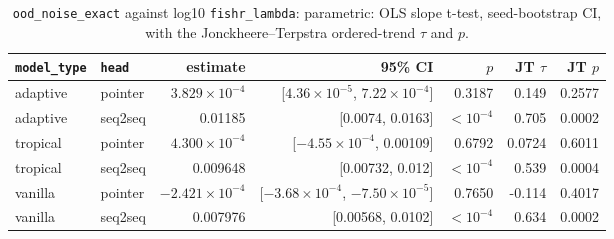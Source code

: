 \documentclass[10pt]{article}
\begin{document}
{\small
\begin{longtable}{llrrrrr}
\caption{\texttt{ood\_noise\_exact} against log10 \texttt{fishr\_lambda}: parametric: OLS slope t-test, seed-bootstrap CI, with the Jonckheere--Terpstra ordered-trend $\tau$ and $p$.}\label{tab:trend-ood_noise_exact}\\
\toprule
\texttt{model\_type} & \texttt{head} & estimate & 95\% CI & $p$ & JT $\tau$ & JT $p$\\
\midrule
\endhead
adaptive & pointer & $3.829\times10^{-4}$ & [$4.36\times10^{-5}$, $7.22\times10^{-4}$] & 0.3187 & 0.149 & 0.2577\\
adaptive & seq2seq & 0.01185 & [0.0074, 0.0163] & $<10^{-4}$ & 0.705 & 0.0002\\
tropical & pointer & $4.300\times10^{-4}$ & [$-4.55\times10^{-4}$, 0.00109] & 0.6792 & 0.0724 & 0.6011\\
tropical & seq2seq & 0.009648 & [0.00732, 0.012] & $<10^{-4}$ & 0.539 & 0.0004\\
vanilla & pointer & $-2.421\times10^{-4}$ & [$-3.68\times10^{-4}$, $-7.50\times10^{-5}$] & 0.7650 & -0.114 & 0.4017\\
vanilla & seq2seq & 0.007976 & [0.00568, 0.0102] & $<10^{-4}$ & 0.634 & 0.0002\\
\bottomrule
\end{longtable}
}
\end{document}
